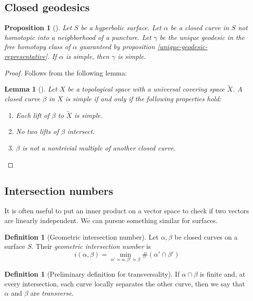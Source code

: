 \documentclass[reqno]{amsart}
\newtheorem{lemma}[theorem]{Lemma}
\newtheorem{proposition}[theorem]{Proposition}
\theoremstyle{definition}
\newtheorem{definition}[theorem]{Definition}
\theoremstyle{remark}
\begin{document}
\subsection*{Closed geodesics}

\begin{proposition}[]
    Let $S$ be a hyperbolic surface. Let $\alpha$ be a closed curve
    in $S$ not homotopic into a neighborhood of a puncture. Let
    $\gamma$ be the unique geodesic in the free homotopy class of
    $\alpha$ guaranteed by proposition \ref{unique-geodesic-representative}.
    If $\alpha$ is simple, then $\gamma$ is simple.
\end{proposition}

\begin{proof}
    Follows from the following lemma:
    \begin{lemma}[]
        Let $X$ be a topological space with a universal covering space
         $\tilde{X}$. A closed curve $\beta$ in $X$ is simple if and
        only if the following properties hold:
        \begin{enumerate}
            \item Each lift of $\beta$ to $\tilde{X}$ is simple.
            \item No two lifts of $\beta$ intersect.
            \item  $\beta$ is not a nontrivial multiple of another closed
                curve.
         \end{enumerate}
    \end{lemma}
\end{proof}

\subsection*{Intersection numbers}

It is often useful to put an inner product on a vector space to check
if two vectors are linearly independent. We can pursue something similar for
surfaces.

\begin{definition}[Geometric intersection number]
    Let $\alpha, \beta$ be closed curves on a surface $S$.
    Their \textit{geometric intersection number} is
    \[
    i \left( \alpha, \beta \right) =
    \min_{\alpha' \simeq \alpha, \beta' \simeq \beta}
    \# \left( \alpha' \cap \beta' \right) 
    \] 
\end{definition}

\begin{definition}[Preliminary definition for transversality]
If $\alpha \cap \beta$ is finite and, at every intersection, each
curve locally separates the other curve, then we say that
$\alpha$ and $\beta$ are \textit{transverse}.
\end{definition}
\end{document}
